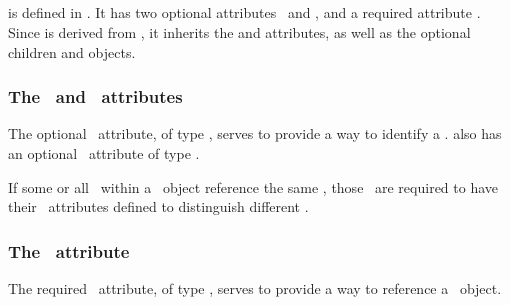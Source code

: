 \clearpage

\subsection{}
\label{def:CompartmentReference}

 is defined in . It has two optional attributes \idAtt\ and \nameAtt, and a required attribute \compartmentAtt.  Since  is derived from , it inherits the  and  attributes, as well as the optional children  and  objects. 

\subsubsection{The \idAtt\ and \nameAtt\ attributes}
\label{def:CompartmentReference:idAndName}

The optional \idAtt\ attribute, of type \SIdPT, serves to provide a way to identify a \compartmentReference. \CompartmentReference also has an optional \nameAtt\ attribute of type \stringPT. 

 If some or all \compartmentReferences\ within a \ListOfCompartmentReferences\ object reference the same , those \compartmentReferences\ are required to have their \idAtt\ attributes defined to distinguish different \compartmentReferences. 

\subsubsection{The \compartmentAtt\ attribute}
\label{def:CompartmentReference:compartment}

The required \compartmentAtt\ attribute, of type \SIdRefPT, serves to provide a way to reference a \ExCompartment\ object. 

\label{def:CompartmentCircularReferencesNotAllowed}

